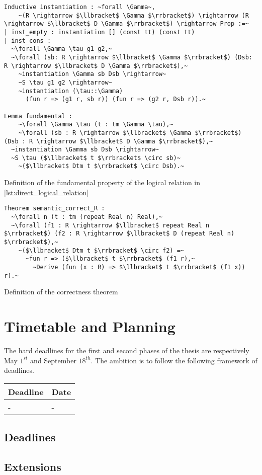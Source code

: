 \documentclass[12pt, final]{article}
\begin{document}
\begin{listing}
  \begin{verbatim}
Inductive instantiation : ~forall \Gamma~,
    ~(R \rightarrow $\llbracket$ \Gamma $\rrbracket$) \rightarrow (R \rightarrow $\llbracket$ D \Gamma $\rrbracket$) \rightarrow Prop :=~
| inst_empty : instantiation [] (const tt) (const tt)
| inst_cons :
  ~\forall \Gamma \tau g1 g2,~
  ~\forall (sb: R \rightarrow $\llbracket$ \Gamma $\rrbracket$) (Dsb: R \rightarrow $\llbracket$ D \Gamma $\rrbracket$),~
    ~instantiation \Gamma sb Dsb \rightarrow~
    ~S \tau g1 g2 \rightarrow~
    ~instantiation (\tau::\Gamma)
      (fun r => (g1 r, sb r)) (fun r => (g2 r, Dsb r)).~

Lemma fundamental :
    ~\forall \Gamma \tau (t : tm \Gamma \tau),~
    ~\forall (sb : R \rightarrow $\llbracket$ \Gamma $\rrbracket$) (Dsb : R \rightarrow $\llbracket$ D \Gamma $\rrbracket$),~
  ~instantiation \Gamma sb Dsb \rightarrow~
  ~S \tau ($\llbracket$ t $\rrbracket$ \circ sb)~
    ~($\llbracket$ Dtm t $\rrbracket$ \circ Dsb).~
  \end{verbatim}
  \caption{Definition of the fundamental property of the logical relation in \ref{lst:direct_logical_relation}}
  \label{lst:direct_fundamental}
\end{listing}

\begin{listing}
  \begin{verbatim}
Theorem semantic_correct_R :
  ~\forall n (t : tm (repeat Real n) Real),~
  ~\forall (f1 : R \rightarrow $\llbracket$ repeat Real n $\rrbracket$) (f2 : R \rightarrow $\llbracket$ D (repeat Real n) $\rrbracket$),~
    ~($\llbracket$ Dtm t $\rrbracket$ \circ f2) =~
      ~fun r => ($\llbracket$ t $\rrbracket$ (f1 r),~
        ~Derive (fun (x : R) => $\llbracket$ t $\rrbracket$ (f1 x)) r).~
  \end{verbatim}
  \caption{Definition of the correctness theorem}
  \label{lst:direct_correctness}
\end{listing}

\section{Timetable and Planning}

The hard deadlines for the first and second phases of the thesis are respectively May $1^{st}$ and September $18^{th}$. The ambition is to follow the following framework of deadlines.

\begin{center}
  \begin{tabular}{ | m{5cm} | m{5cm} | }
   \hline
   Deadline & Date  \\
   \hline
   - & - \\
   \hline
  \end{tabular}
\end{center}

\subsection{Deadlines}

\subsection{Extensions}

\printbibliography
% 

\makeatother
\end{document}
